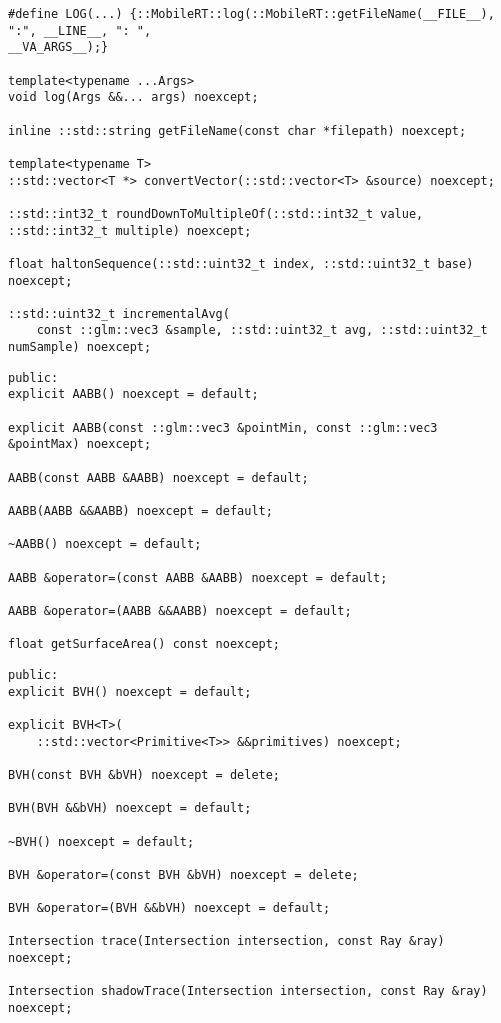 \begin{lstlisting}[caption={Utils API}, captionpos=b, label=API_Utils]
#define LOG(...) {::MobileRT::log(::MobileRT::getFileName(__FILE__), ":", __LINE__, ": ",
__VA_ARGS__);}

template<typename ...Args>
void log(Args &&... args) noexcept;

inline ::std::string getFileName(const char *filepath) noexcept;

template<typename T>
::std::vector<T *> convertVector(::std::vector<T> &source) noexcept;

::std::int32_t roundDownToMultipleOf(::std::int32_t value, ::std::int32_t multiple) noexcept;

float haltonSequence(::std::uint32_t index, ::std::uint32_t base) noexcept;

::std::uint32_t incrementalAvg(
	const ::glm::vec3 &sample, ::std::uint32_t avg, ::std::uint32_t numSample) noexcept;
\end{lstlisting}

\begin{lstlisting}[caption={AABB API}, captionpos=b, label=API_AABB]
public:
explicit AABB() noexcept = default;

explicit AABB(const ::glm::vec3 &pointMin, const ::glm::vec3 &pointMax) noexcept;

AABB(const AABB &AABB) noexcept = default;

AABB(AABB &&AABB) noexcept = default;

~AABB() noexcept = default;

AABB &operator=(const AABB &AABB) noexcept = default;

AABB &operator=(AABB &&AABB) noexcept = default;

float getSurfaceArea() const noexcept;
\end{lstlisting}

\begin{lstlisting}[caption={BVH API}, captionpos=b, label=API_BVH]
public:
explicit BVH() noexcept = default;

explicit BVH<T>(
	::std::vector<Primitive<T>> &&primitives) noexcept;

BVH(const BVH &bVH) noexcept = delete;

BVH(BVH &&bVH) noexcept = default;

~BVH() noexcept = default;

BVH &operator=(const BVH &bVH) noexcept = delete;

BVH &operator=(BVH &&bVH) noexcept = default;

Intersection trace(Intersection intersection, const Ray &ray) noexcept;

Intersection shadowTrace(Intersection intersection, const Ray &ray) noexcept;
\end{lstlisting}

